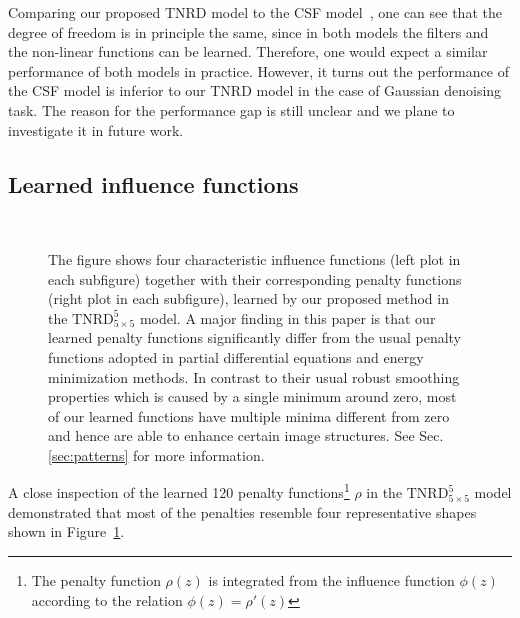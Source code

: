 \documentclass[10pt,journal,compsoc]{IEEEtran}
\begin{document}
Comparing our proposed TNRD model to the CSF model~\cite{CSF2014}, one
can see that the degree of freedom is in principle the same, since in
both models the filters and the non-linear functions can be
learned. Therefore, one would expect a similar performance of both
models in practice. However, it turns out the performance of the CSF
model is inferior to our TNRD model in the case of Gaussian denoising
task. The reason for the performance gap is still unclear and
we plane to investigate it in future work.

\subsection{Learned influence functions} \label{influence}
\begin{figure}[t!]
\vspace*{-0.1cm}\centering
{}\hfill
{}\\
\vspace*{-0.3cm}
\hfill
{}
\caption{The figure shows four characteristic influence functions
  (left plot in each subfigure) together with their corresponding
  penalty functions (right plot in each subfigure), learned by our
  proposed method in the $\text{TNRD}_{5 \times 5}^5$ model. A major finding in this paper is that our learned
  penalty functions significantly differ from the usual penalty
  functions adopted in partial differential equations and energy minimization
  methods. In contrast to their usual robust smoothing properties
  which is caused by a single minimum around zero, most of our learned
  functions have multiple minima different from zero and hence are
  able to enhance certain image structures. See Sec. \ref{sec:patterns} for more
  information.}\label{functions}
\vspace{-0.25cm}
\end{figure}
{
A close inspection of the learned 120 penalty functions\footnote{The penalty function $\rho(z)$ is integrated from the influence function $\phi(z)$ according 
to the relation $\phi(z) = \rho'(z)$} $\rho$ in the $\text{TNRD}_{5 \times 5}^5$
model demonstrated that most of the penalties resemble four representative shapes 
shown in Figure~\ref{functions}.}
\end{document}
